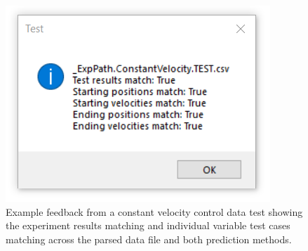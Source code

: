 \documentclass[journal]{IEEEtran}
\begin{document}
\begin{figure}[h]
    \centering
    \includegraphics[width=0.7\linewidth]{TestConstant.png}
    \caption{Example feedback from a constant velocity control data test showing the experiment results matching and individual variable test cases matching across the parsed data file and both prediction methods.}
    \label{fig:testconstant}
\end{figure}

\end{document}
